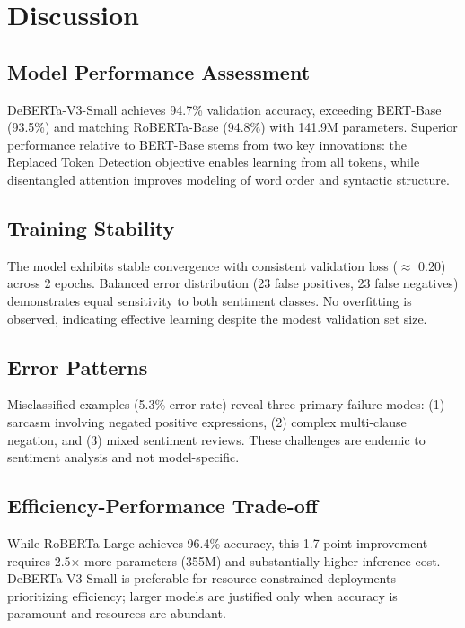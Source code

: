 \documentclass[pdflatex,sn-mathphys-num]{sn-jnl}
\theoremstyle{thmstyleone}%
\theoremstyle{thmstyletwo}%
\theoremstyle{thmstylethree}%
\begin{document}
\section{Discussion}\label{sec5}

\subsection{Model Performance Assessment}

DeBERTa-V3-Small achieves 94.7\% validation accuracy, exceeding BERT-Base (93.5\%) and matching RoBERTa-Base (94.8\%) with 141.9M parameters. Superior performance relative to BERT-Base stems from two key innovations: the Replaced Token Detection objective \cite{clark2020electra} enables learning from all tokens, while disentangled attention \cite{he2021deberta} improves modeling of word order and syntactic structure.

\subsection{Training Stability}

The model exhibits stable convergence with consistent validation loss ($\approx$ 0.20) across 2 epochs. Balanced error distribution (23 false positives, 23 false negatives) demonstrates equal sensitivity to both sentiment classes. No overfitting is observed, indicating effective learning despite the modest validation set size.

\subsection{Error Patterns}

Misclassified examples (5.3\% error rate) reveal three primary failure modes: (1) sarcasm involving negated positive expressions, (2) complex multi-clause negation, and (3) mixed sentiment reviews. These challenges are endemic to sentiment analysis and not model-specific.

\subsection{Efficiency-Performance Trade-off}

While RoBERTa-Large achieves 96.4\% accuracy, this 1.7-point improvement requires 2.5× more parameters (355M) and substantially higher inference cost. DeBERTa-V3-Small is preferable for resource-constrained deployments prioritizing efficiency; larger models are justified only when accuracy is paramount and resources are abundant.
\end{document}
